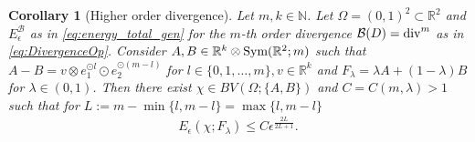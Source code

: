 \documentclass[a4paper, 10pt, twoside, notitlepage]{amsart}
\theoremstyle{plain}
\newtheorem{cor}[prop]{Corollary}
\newcommand{\R}{\mathbb{R}}
\newcommand{\N}{\mathbb{N}}
\begin{document}
                
                  \begin{cor}[Higher order divergence]
                    Let $m, k \in \N$. Let $\Omega = (0,1)^2 \subset \R^2$ and $E_\epsilon^{\mathcal{B}}$ as in \eqref{eq:energy_total_gen} for the $m$-th order divergence $\mathcal{B}(D) = \operatorname{div}^m$ as in \eqref{eq:DivergenceOp}.
                    Consider $A,B \in \R^k \otimes \textup{Sym}(\R^2;m)$ such that $A-B = v \otimes e_1^{\odot l} \odot e_2^{\odot (m-l)}$ for $l \in \{0,1,\dots,m\}, v\in \R^k$ and $F_\lambda = \lambda A + (1-\lambda)B$ for $\lambda \in (0,1)$.
                    Then there exist $\chi \in BV(\Omega;\{A,B\})$ and $C = C(m,\lambda) > 1$ such that for $L := m - \min\{l,m-l\} = \max\{l,m-l\}$  
                    \begin{align*}
                      E_\epsilon(\chi;F_\lambda) \leq C \epsilon^{\frac{2L}{2L+1}}.
                    \end{align*}
                  \end{cor} 
\end{document}
